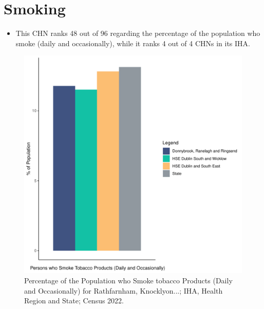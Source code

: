 \documentclass{article}
\begin{document}
\pagebreak

\section{Smoking}\label{sect:Smoking}
\begin{itemize}
\item This CHN ranks  48 out of 96 regarding the percentage of the population who smoke (daily and occasionally), while it ranks   4 out of 4 CHNs in its IHA.
\end{itemize}
\begin{figure}[H]
	\centering
	\includegraphics[width = 120mm]{../figures/SmokingED.pdf}
	\caption{Percentage of the Population who Smoke tobacco Products (Daily and Occasionally) for Rathfarnham, Knocklyon...; IHA, Health Region and State; Census 2022.}
	\label{fig:2ae19629-1a6a-13a3-e055-000000000001}
	\end{figure}
	
\end{document}
